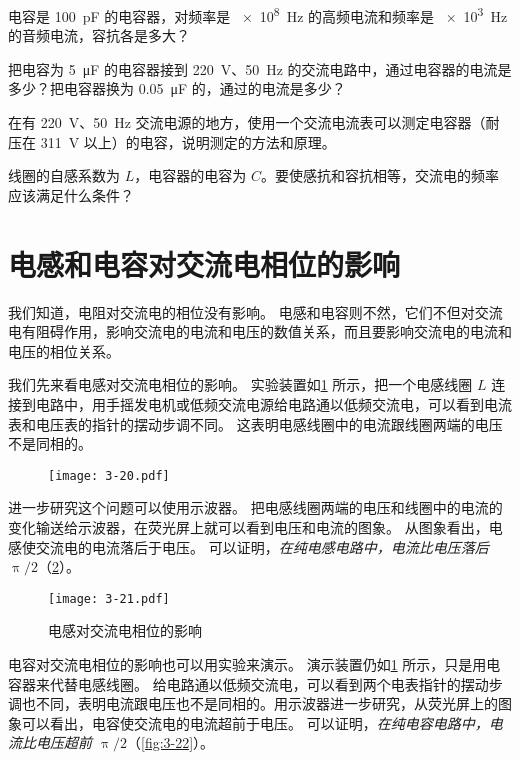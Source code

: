 \begin{Practice}
\begin{question}
  \item 电容是 \qty{100}{\pico F} 的电容器，对频率是 \qty{e8}{Hz} 的高频电流和频率是 \qty{e3}{Hz} 的音频电流，容抗各是多大？
  \item 把电容为 \qty{5}{\micro F} 的电容器接到 \qty{220}{V}、\qty{50}{Hz} 的交流电路中，通过电容器的电流是多少？把电容器换为 \qty{0.05}{\micro F} 的，通过的电流是多少？
  \item 在有 \qty{220}{V}、\qty{50}{Hz} 交流电源的地方，使用一个交流电流表可以测定电容器（耐压在 \qty{311}{V} 以上）的电容，说明测定的方法和原理。
  \item 线圈的自感系数为 $L$，电容器的电容为 $C$。要使感抗和容抗相等，交流电的频率应该满足什么条件？
\end{question}
\end{Practice}

\section{电感和电容对交流电相位的影响}
我们知道，电阻对交流电的相位没有影响。
电感和电容则不然，它们不但对交流电有阻碍作用，影响交流电的电流和电压的数值关系，而且要影响交流电的电流和电压的相位关系。

我们先来看电感对交流电相位的影响。
实验装置如\cref{fig:3-20} 所示，把一个电感线圈 $L$ 连接到电路中，用手摇发电机或低频交流电源给电路通以低频交流电，可以看到电流表和电压表的指针的摆动步调不同。
这表明电感线圈中的电流跟线圈两端的电压不是同相的。
\begin{figure}
  \texttt{[image: 3-20.pdf]}
  \caption{}\label{fig:3-20}
\end{figure}

进一步研究这个问题可以使用示波器。
把电感线圈两端的电压和线圈中的电流的变化输送给示波器，在荧光屏上就可以看到电压和电流的图象。
从图象看出，电感使交流电的电流落后于电压。
可以证明，\emph{在纯电感电路中，电流比电压落后 $\uppi/2$}（\cref{fig:3-21}）。
\begin{figure}
  \texttt{[image: 3-21.pdf]}
  \caption{电感对交流电相位的影响}\label{fig:3-21}
\end{figure}

电容对交流电相位的影响也可以用实验来演示。
演示装置仍如\cref{fig:3-20} 所示，只是用电容器来代替电感线圈。
给电路通以低频交流电，可以看到两个电表指针的摆动步调也不同，表明电流跟电压也不是同相的。用示波器进一步研究，从荧光屏上的图象可以看出，电容使交流电的电流超前于电压。
可以证明，\emph{在纯电容电路中，电流比电压超前 $\uppi/2$}（\cref{fig:3-22}）。

